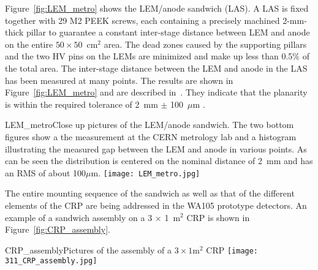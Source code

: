 Figure~\ref{fig:LEM_metro} shows the LEM/anode sandwich (LAS).  A LAS is 
fixed together with 29 M2 PEEK screws, each containing a precisely
machined 2-mm-thick pillar to guarantee a constant inter-stage
distance between LEM and anode on the entire $50\times50$~cm$^2$
area.  The dead zones caused by the supporting pillars and the two HV
pins on the LEMs are minimized and make up less than 0.5\% of the
total area. The inter-stage distance between the LEM and anode in the
LAS has been measured at many points. The results are shown in
Figure~\ref{fig:LEM_metro} and are described
in~\cite{EDMS_metro_lem_anode}. They indicate that the planarity is
within the required tolerance of 2~mm $\pm$ 100~$\mu$m .
\begin{cdrfigure}{LEM_metro}{Close up pictures of the LEM/anode sandwich. The two
       bottom figures show a the measurement at the CERN metrology lab
       and a histogram illustrating the measured gap between the LEM
       and anode in various points. As can be seen the distribution is
       centered on the nominal distance of 2~mm and has an RMS of
       about 100$\mu$m.}
     \texttt{[image: LEM\_metro.jpg]}
\end{cdrfigure}

The entire mounting sequence of the sandwich as well as that of the
different elements of the CRP are being addressed in the WA105
prototype detectors. An example of a sandwich assembly on a
3 $\times$ 1~m$^2$ CRP is shown in Figure~\ref{fig:CRP_assembly}.
\begin{cdrfigure}{CRP_assembly}{Pictures of the assembly of a $3\times1$m$^2$ CRP}
     \texttt{[image: 311\_CRP\_assembly.jpg]}  
\end{cdrfigure}


